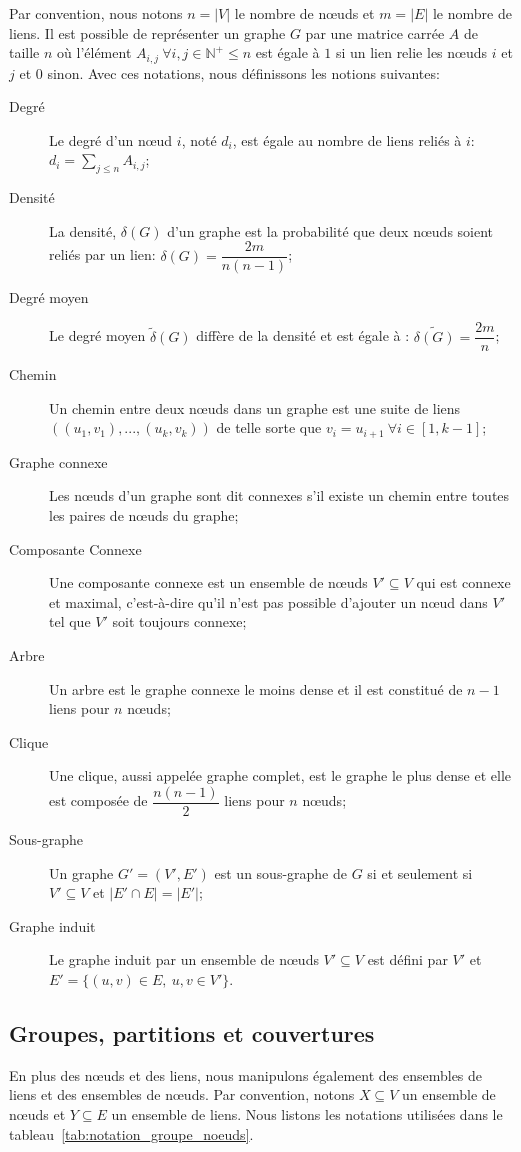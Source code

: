 Par convention, nous notons $n=|V|$ le nombre de n\oe uds et $m=|E|$ le nombre de liens.
Il est possible de représenter un graphe $G$ par une matrice carrée $A$ de taille $n$ où l'élément $A_{i,j} \ \forall i,j \in \mathbb{N}^+ \leq n$ est égale à $1$ si un lien relie les n\oe uds $i$ et $j$ et $0$ sinon.
Avec ces notations, nous définissons les notions suivantes:
\begin{description}
\item[Degré] Le degré d'un n\oe ud $i$, noté $d_i$, est égale au nombre de liens reliés à $i$: $d_i = \sum_{j\leq n} A_{i,j}$;
\item[Densité] La densité, $\delta(G)$ d'un graphe est la probabilité que deux n\oe uds soient reliés par un lien: $\delta(G)=\dfrac{2m}{n(n-1)}$;
\item[Degré moyen] Le degré moyen $\tilde{\delta}(G)$ diffère de la densité et est égale à : $\tilde{\delta(G)}=\dfrac{2m}{n}$;
\item[Chemin] Un chemin entre deux n\oe uds dans un graphe est une suite de liens $((u_1,v_1),...,(u_k,v_k))$ de telle sorte que $v_{i}=u_{i+1} \ \forall i \in [1,k-1]$;
\item[Graphe connexe] Les n\oe uds d'un graphe sont dit connexes s'il existe un chemin entre toutes les paires de n\oe uds du graphe;
\item[Composante Connexe] Une composante connexe est un ensemble de n\oe uds $V'\subseteq V$ qui est connexe et maximal, c'est-à-dire qu'il n'est pas possible d'ajouter un n\oe ud dans $V'$ tel que $V'$ soit toujours connexe;
\item[Arbre] Un arbre est le graphe connexe le moins dense et il est constitué de $n-1$ liens pour $n$ n\oe uds;
\item[Clique] Une clique, aussi appelée graphe complet, est le graphe le plus dense et elle est composée de $\dfrac{n(n-1)}{2}$ liens pour $n$ n\oe uds;
\item[Sous-graphe] Un graphe $G'=(V',E')$ est un sous-graphe de $G$ si et seulement si $V' \subseteq V$ et $|E'\cap E| = |E'|$;
\item[Graphe induit] Le graphe induit par un ensemble de n\oe uds $V' \subseteq V$ est défini par $V'$ et $E'= \{(u,v) \in E,\ u,v \in V'\}$.  
\end{description}



\subsection{Groupes, partitions et couvertures}
En plus des n\oe uds et des liens, nous manipulons également des ensembles de liens et des ensembles de n\oe uds.
Par convention, notons $X \subseteq V$ un ensemble de n\oe uds et $Y \subseteq E$ un ensemble de liens.
Nous listons les notations utilisées dans le tableau~\ref{tab:notation_groupe_noeuds}.


